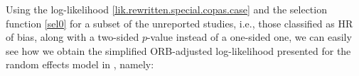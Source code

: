 \documentclass[twocolumn]{article}\usepackage[]{graphicx}\usepackage[]{xcolor}
\begin{document}







Using the log-likelihood \eqref{lik.rewritten.special.copas.case} and the selection function \eqref{sel0} for a subset of the unreported studies, i.e., those classified as HR of bias, along with a two-sided $p$-value instead of a one-sided one, we can easily see how we obtain the simplified ORB-adjusted log-likelihood presented for the random effects model in \citet{Copas2019}, namely:

\bigskip
\end{document}
